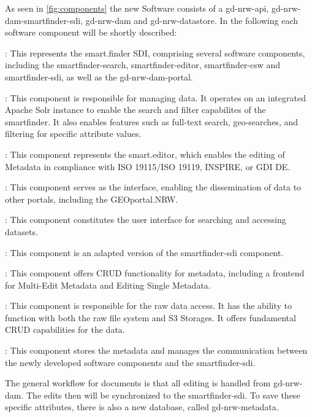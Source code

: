 \documentclass[11pt, titlepage, a4paper]{article}
\begin{document}
As seen in \ref{fig:components} the new Software consists of a gd-nrw-api, gd-nrw-dam-smartfinder-sdi, gd-nrw-dam and gd-nrw-datastore.
In the following each software component will be shortly described:
\begin{description}[]
	\item[gd-nrw-dam-smartfinder-sdi]: This represents the smart.finder SDI, comprising several software components, including the smartfinder-search, smartfinder-editor, smartfinder-csw and smartfinder-sdi, as well as the gd-nrw-dam-portal.
	      \begin{description}[]
		      \item[smartfinder-search]: This component is responsible for managing data. It operates on an integrated Apache Solr instance to enable the search and filter capabilites of the smartfinder. It also enables features such as full-text search, geo-searches, and filtering for specific attribute values.
		      \item[smartfinder-editor]: This component represents the smart.editor, which enables the editing of Metadata in compliance with ISO 19115/ISO 19119, INSPIRE, or GDI DE.
		      \item[smartfinder-csw]: This component serves as the  interface, enabling the dissemination of data to other portals, including the GEOportal.NRW.
		      \item[smartfinder-sdi]: This component constitutes the user interface for searching and accessing datasets.
		      \item[gd-nrw-dam-portal]: This component is an adapted version of the smartfinder-sdi component.
	      \end{description}
	\item[gd-nrw-dam]: This component offers CRUD functionality for metadata, including a frontend for Multi-Edit Metadata and Editing Single Metadata.
	\item[gd-nrw-datastore]: This component is responsible for the raw data access. It has the ability to function with both the raw file system and S3 Storages. It offers fundamental CRUD capabilities for the data.
	\item[gd-nrw-api]: This component stores the metadata and manages the communication between the newly developed software components and the smartfinder-sdi.
\end{description}
The general workflow for documents is that all editing is handled from gd-nrw-dam. The edits then will be synchronized to the smartfinder-sdi.
To save these  specific attributes, there is also a new database, called gd-nrw-metadata.
\end{document}
